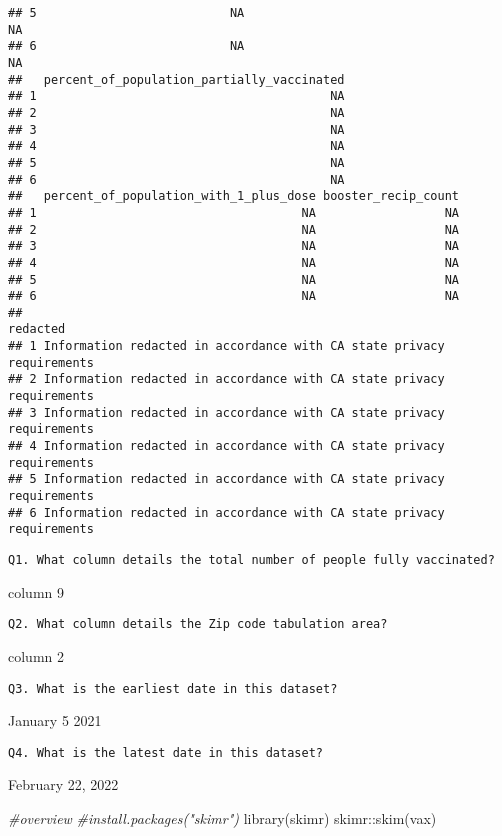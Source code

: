 \documentclass[
]{article}
\newenvironment{Shaded}{\begin{snugshade}}{\end{snugshade}}
\newcommand{\CommentTok}[1]{\textcolor[rgb]{0.56,0.35,0.01}{\textit{#1}}}
\newcommand{\FunctionTok}[1]{\textcolor[rgb]{0.00,0.00,0.00}{#1}}
\newcommand{\NormalTok}[1]{#1}
\newcommand{\SpecialCharTok}[1]{\textcolor[rgb]{0.00,0.00,0.00}{#1}}
\begin{document}
\begin{verbatim}
## 5                           NA                                     NA
## 6                           NA                                     NA
##   percent_of_population_partially_vaccinated
## 1                                         NA
## 2                                         NA
## 3                                         NA
## 4                                         NA
## 5                                         NA
## 6                                         NA
##   percent_of_population_with_1_plus_dose booster_recip_count
## 1                                     NA                  NA
## 2                                     NA                  NA
## 3                                     NA                  NA
## 4                                     NA                  NA
## 5                                     NA                  NA
## 6                                     NA                  NA
##                                                                redacted
## 1 Information redacted in accordance with CA state privacy requirements
## 2 Information redacted in accordance with CA state privacy requirements
## 3 Information redacted in accordance with CA state privacy requirements
## 4 Information redacted in accordance with CA state privacy requirements
## 5 Information redacted in accordance with CA state privacy requirements
## 6 Information redacted in accordance with CA state privacy requirements
\end{verbatim}

\begin{verbatim}
Q1. What column details the total number of people fully vaccinated?
\end{verbatim}

column 9

\begin{verbatim}
Q2. What column details the Zip code tabulation area?
\end{verbatim}

column 2

\begin{verbatim}
Q3. What is the earliest date in this dataset?
\end{verbatim}

January 5 2021

\begin{verbatim}
Q4. What is the latest date in this dataset?
\end{verbatim}

February 22, 2022

\begin{Shaded}
\begin{Highlighting}[]
\CommentTok{\#overview}
\CommentTok{\#install.packages("skimr")}
\FunctionTok{library}\NormalTok{(skimr)}
\NormalTok{skimr}\SpecialCharTok{::}\FunctionTok{skim}\NormalTok{(vax)}
\end{Highlighting}
\end{Shaded}
\end{document}
